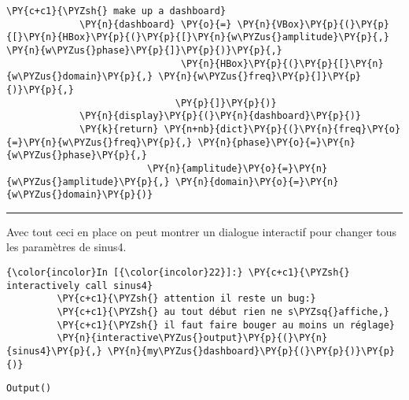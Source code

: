 \begin{Verbatim}[commandchars=\\\{\},frame=single,framerule=0.3mm,rulecolor=\color{cellframecolor}]
             \PY{c+c1}{\PYZsh{} make up a dashboard}
             \PY{n}{dashboard} \PY{o}{=} \PY{n}{VBox}\PY{p}{(}\PY{p}{[}\PY{n}{HBox}\PY{p}{(}\PY{p}{[}\PY{n}{w\PYZus{}amplitude}\PY{p}{,} \PY{n}{w\PYZus{}phase}\PY{p}{]}\PY{p}{)}\PY{p}{,}
                               \PY{n}{HBox}\PY{p}{(}\PY{p}{[}\PY{n}{w\PYZus{}domain}\PY{p}{,} \PY{n}{w\PYZus{}freq}\PY{p}{]}\PY{p}{)}\PY{p}{,}
                              \PY{p}{]}\PY{p}{)}
             \PY{n}{display}\PY{p}{(}\PY{n}{dashboard}\PY{p}{)}
             \PY{k}{return} \PY{n+nb}{dict}\PY{p}{(}\PY{n}{freq}\PY{o}{=}\PY{n}{w\PYZus{}freq}\PY{p}{,} \PY{n}{phase}\PY{o}{=}\PY{n}{w\PYZus{}phase}\PY{p}{,}
                         \PY{n}{amplitude}\PY{o}{=}\PY{n}{w\PYZus{}amplitude}\PY{p}{,} \PY{n}{domain}\PY{o}{=}\PY{n}{w\PYZus{}domain}\PY{p}{)}
\end{Verbatim}


    \begin{center}\rule{0.5\linewidth}{\linethickness}\end{center}

Avec tout ceci en place on peut montrer un dialogue interactif pour
changer tous les paramètres de sinus4.

    \begin{Verbatim}[commandchars=\\\{\},frame=single,framerule=0.3mm,rulecolor=\color{cellframecolor}]
{\color{incolor}In [{\color{incolor}22}]:} \PY{c+c1}{\PYZsh{} interactively call sinus4}
         \PY{c+c1}{\PYZsh{} attention il reste un bug:}
         \PY{c+c1}{\PYZsh{} au tout début rien ne s\PYZsq{}affiche,}
         \PY{c+c1}{\PYZsh{} il faut faire bouger au moins un réglage}
         \PY{n}{interactive\PYZus{}output}\PY{p}{(}\PY{n}{sinus4}\PY{p}{,} \PY{n}{my\PYZus{}dashboard}\PY{p}{(}\PY{p}{)}\PY{p}{)}
\end{Verbatim}


    
    
    
    \begin{verbatim}
Output()
    \end{verbatim}

    

    
    
    
